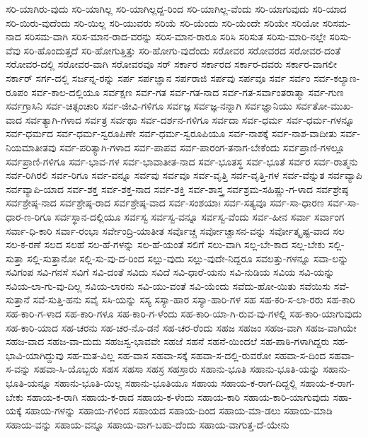 {ಸರಿ-ಯಾಗಿರು-ವುದು
ಸರಿ-ಯಾಗಿಲ್ಲ
ಸರಿ-ಯಾಗಿಲ್ಲದ್ದ-ರಿಂದ
ಸರಿ-ಯಾಗಿಲ್ಲ-ವೆಂದು
ಸರಿ-ಯಾಗುವುದು
ಸರಿ-ಯಾದ
ಸರಿ-ಯಿರು-ವುದೆಂದು
ಸರಿ-ಯಿಲ್ಲ
ಸರಿ-ಯುವರು
ಸರಿಯೆ
ಸರಿ-ಯೆಂದು
ಸರಿ-ಯೆಂದೇ
ಸರಿಯೇ
ಸರಿಯೋ
ಸರಿಸಮ-ನಾದ
ಸರಿಸಮ-ವಾಗಿ
ಸರಿಸ-ಮಾನ-ರಾದ-ವರನ್ನು
ಸರಿಸ-ಮಾನ-ರಾರೂ
ಸರಿಸಿ
ಸರಿಸುತ
ಸರಿಸು-ಮಾರಿ-ನಲ್ಲೇ
ಸರಿಸು-ವೆವು
ಸರಿ-ಹೊಂದುತ್ತದೆ
ಸರಿ-ಹೋಗುತ್ತಿತ್ತು
ಸರಿ-ಹೋಗು-ವುದೆಂದು
ಸರೋವರ
ಸರೋವರದ
ಸರೋವರ-ದಂತೆ
ಸರೋವರ-ದಲ್ಲಿ
ಸರೋವರ-ವಾಗಿ
ಸರೋವರವೂ
ಸರ್
ಸರ್ಕಾರ
ಸರ್ಕಾರದ
ಸರ್ಕಾರ-ದವರು
ಸರ್ಕಾರ-ವಾಗಲೀ
ಸರ್ಕಾರ್
ಸರ್ಗ-ದಲ್ಲಿ
ಸರ್ಜನ್ನ-ರನ್ನು
ಸರ್ಪ
ಸರ್ಪಜ್ಞಾನ
ಸರ್ಪರಾಜಿ
ಸರ್ಪವು
ಸರ್ಪವೂ
ಸರ್ವ
ಸರ್ವಂ
ಸರ್ವ-ಕಲ್ಯಾಣ-ರೂಪಂ
ಸರ್ವ-ಕಾಲ-ದಲ್ಲಿಯೂ
ಸರ್ವಕ್ಷಣ
ಸರ್ವ-ಗತ
ಸರ್ವ-ಗತ-ನಾದ
ಸರ್ವ-ಗತ-ಸರ್ವಾಂತರಾತ್ಮಾ
ಸರ್ವ-ಗುಣ
ಸರ್ವಗ್ರಾಸಿನಿ
ಸರ್ವ-ಚಿತ್ಸಂಚಾರಿ
ಸರ್ವ-ಜೀವಿ-ಗಳಿಗೂ
ಸರ್ವಜ್ಞ
ಸರ್ವಜ್ಞ-ನನ್ನಾಗಿ
ಸರ್ವಜ್ಞಾನಿಯು
ಸರ್ವತೋ-ಮುಖ-ವಾದ
ಸರ್ವತ್ಯಾಗಿ-ಗಳಾದ
ಸರ್ವತ್ರ
ಸರ್ವಥಾ
ಸರ್ವ-ದರ್ಶನ-ಗಳಿಗೂ
ಸರ್ವದಾ
ಸರ್ವ-ಧರ್ಮ
ಸರ್ವ-ಧರ್ಮ-ಗಳನ್ನೂ
ಸರ್ವ-ಧರ್ಮದ
ಸರ್ವ-ಧರ್ಮ-ಸ್ವರೂಪಿಣೇ
ಸರ್ವ-ಧರ್ಮ-ಸ್ವರೂಪಿಯೂ
ಸರ್ವ-ನಾಶಕ್ಕೆ
ಸರ್ವ-ನಾಶ-ವಾದೀತು
ಸರ್ವ-ನಿಯಮಾತೀತವು
ಸರ್ವ-ಪರಿತ್ಯಾಗಿ-ಗಳಾದ
ಸರ್ವ-ಪಾಪವ
ಸರ್ವ-ಪಾರಂಗ-ತನಾಗ-ಬೇಕೆಂದು
ಸರ್ವಪ್ರಾಣಿ-ಗಳಲ್ಲೂ
ಸರ್ವಪ್ರಾಣಿ-ಗಳಿಗೂ
ಸರ್ವ-ಭಾವ-ಗಳ
ಸರ್ವ-ಭಾವಾತೀತ-ನಾದ
ಸರ್ವ-ಭೂತಸ್ಥ
ಸರ್ವ-ಭೂತೆ
ಸರ್ವರ
ಸರ್ವ-ರಾತ್ಮನು
ಸರ್ವ-ರಿಗಿರಲಿ
ಸರ್ವ-ರಿಗೂ
ಸರ್ವ-ವನ್ನೂ
ಸರ್ವವು
ಸರ್ವವೂ
ಸರ್ವ-ವೃತ್ತಿ
ಸರ್ವ-ವೃತ್ತಿ-ಗಳ
ಸರ್ವ-ವೆನ್ನುತ
ಸರ್ವವ್ಯಾಪಿ
ಸರ್ವವ್ಯಾಪಿ-ಯಾದ
ಸರ್ವ-ಶಕ್ತ
ಸರ್ವ-ಶಕ್ತ-ನಾದ
ಸರ್ವ-ಶಕ್ತಿ
ಸರ್ವ-ಶಾಸ್ತ್ರ
ಸರ್ವಶ್ರಮ-ಸಹಿಷ್ಣು-ಗ-ಳಾದ
ಸರ್ವಶ್ರೇಷ್ಠ
ಸರ್ವಶ್ರೇಷ್ಠ-ನಾದ
ಸರ್ವಶ್ರೇಷ್ಠ-ರಾದ
ಸರ್ವಶ್ರೇಷ್ಠ-ವಾದ
ಸರ್ವ-ಸಂಶಯಾಃ
ಸರ್ವ-ಸತ್ಯವೂ
ಸರ್ವ-ಸಾ-ಧಾರಣ
ಸರ್ವ-ಸಾ-ಧಾರ-ಣ-ರಿಗೂ
ಸರ್ವಸ್ಥಾನ-ದಲ್ಲಿಯೂ
ಸರ್ವಸ್ವ
ಸರ್ವಸ್ವ-ವನ್ನೂ
ಸರ್ವಸ್ವ-ವೆಂದು
ಸರ್ವ-ಹೀನ
ಸರ್ವಾ
ಸರ್ವಾಂಗ
ಸರ್ವಾ-ಧಿ-ಕಾರಿ
ಸರ್ವಾ-ರಂಭಾ
ಸರ್ವೇಂದ್ರಿ-ಯಾತೀತ
ಸರ್ವೊಚ್ಚ
ಸರ್ವೋಚ್ಚಾಸನ-ವನ್ನು
ಸರ್ವೋತ್ಕೃಷ್ಟ-ವಾದ
ಸಲ
ಸಲ-ಕ-ರಣೆ
ಸಲದ
ಸಲಹೆ
ಸಲ-ಹೆ-ಗಳನ್ನು
ಸಲ-ಹೆ-ಯಂತೆ
ಸಲಿಗೆ
ಸಲು-ವಾಗಿ
ಸಲ್ಲ-ಬೇ-ಕಾದ
ಸಲ್ಲ-ಬೇಕು
ಸಲ್ಲಿ-ಸುತ್ತಾ
ಸಲ್ಲಿ-ಸುತ್ತಾನೋ
ಸಲ್ಲಿ-ಸು-ವು-ದ-ರಿಂದ
ಸಲ್ಲು-ವುದು
ಸಲ್ಲು-ವುದೇ-ನಿದ್ದರೂ
ಸವಲತ್ತು-ಗಳನ್ನೂ
ಸವಾ-ಲನ್ನು
ಸವಿಗಂಪ
ಸವಿ-ಗನಸೆ
ಸವಿಗೆ
ಸವಿ-ದಂತೆ
ಸವಿದು
ಸವಿದೆ
ಸವಿ-ಧಾರೆ-ಯನು
ಸವಿ-ನುಡಿಯ
ಸವಿಯ
ಸವಿ-ಯನ್ನು
ಸವಿಯ-ಲಾ-ಗು-ವು-ದಿಲ್ಲ
ಸವಿಯ-ಲಾರನು
ಸವಿ-ಯು-ವಂತೆ
ಸವಿ-ಯೆಂದು
ಸವೆದು-ಹೋ-ಯಿತು
ಸವೆಯಿಸು
ಸವೆ-ಸುತ್ತಾನೆ
ಸವೆ-ಸುತ್ತಿ-ಹನು
ಸವೈ
ಸಸಿ-ಯನ್ನು
ಸಸ್ಯ
ಸಸ್ಯಾ-ಹಾರ
ಸಸ್ಯಾ-ಹಾರಿ-ಗಳ
ಸಹ
ಸಹ-ಕರಿ-ಸ-ಲಾ-ರರು
ಸಹ-ಕಾರಿ
ಸಹ-ಕಾರಿ-ಗ-ಳಾದ
ಸಹ-ಕಾರಿ-ಗಳೂ
ಸಹ-ಕಾರಿ-ಗ-ಳೆಂದು
ಸಹ-ಕಾರಿ-ಯಾ-ಗಿ-ರುವ-ವು-ಗಳಲ್ಲಿ
ಸಹ-ಕಾರಿ-ಯಾಗುವುದು
ಸಹ-ಕಾರಿ-ಯಾದ
ಸಹ-ಚರನು
ಸಹ-ಚರ-ನೊ-ಡನೆ
ಸಹ-ಚರ-ರೆಂದು
ಸಹಜ
ಸಹಜಂ
ಸಹಜ-ವಾಗಿ
ಸಹಜ-ವಾಗಿಯೇ
ಸಹಜ-ವಾದ
ಸಹಜ-ವಾ-ದುದು
ಸಹಜಸ್ವ-ಭಾವವೇ
ಸಹಜೆ
ಸಹನೆ
ಸಹನೆ-ಯಿಂದಲೆ
ಸಹ-ಪಾಠಿ-ಗಳಾಗಿದ್ದರು
ಸಹ-ಭಾವಿ-ಯಾಗಿದ್ದುವು
ಸಹ-ಮತ-ವಿಲ್ಲ
ಸಹ-ವಾಸ
ಸಹವಾ-ಸಕ್ಕೆ
ಸಹವಾ-ಸ-ದಲ್ಲಿ-ರುವರೋ
ಸಹವಾ-ಸ-ದಿಂದ
ಸಹವಾ-ಸ-ವನ್ನು
ಸಹವಾ-ಸಿ-ಯೊಬ್ಬರು
ಸಹಸ
ಸಹಸಾ
ಸಹಸ್ರ
ಸಹಸ್ರಾರು
ಸಹಾನು-ಭೂತಿ
ಸಹಾನು-ಭೂತಿ-ಯನ್ನು
ಸಹಾನು-ಭೂತಿ-ಯನ್ನೂ
ಸಹಾನು-ಭೂತಿ-ಯಿಲ್ಲ
ಸಹಾನು-ಭೂತಿಯೂ
ಸಹಾಯ
ಸಹಾಯ-ಕ-ರಾಗ-ದಿದ್ದಲ್ಲಿ
ಸಹಾಯ-ಕ-ರಾಗ-ಬೇಕು
ಸಹಾಯ-ಕ-ರಾಗಿ
ಸಹಾಯ-ಕ-ರಾದ
ಸಹಾಯ-ಕ-ಳೆಂದು
ಸಹಾಯ-ಕಾರಿ
ಸಹಾಯ-ಕಾರಿ-ಯಾಗುವುದು
ಸಹಾ-ಯಕ್ಕೆ
ಸಹಾಯ-ಗಳನ್ನು
ಸಹಾಯ-ಗಳಿಂದ
ಸಹಾಯದ
ಸಹಾಯ-ದಿಂದ
ಸಹಾಯ-ಮಾ-ಡಲು
ಸಹಾಯ-ಮಾಡಿ
ಸಹಾಯ-ವನ್ನು
ಸಹಾಯ-ವನ್ನೂ
ಸಹಾಯ-ವಾಗ-ಬಹು-ದೆಂದು
ಸಹಾಯ-ವಾಗುತ್ತ-ದೆ-ಯೇನು
}
